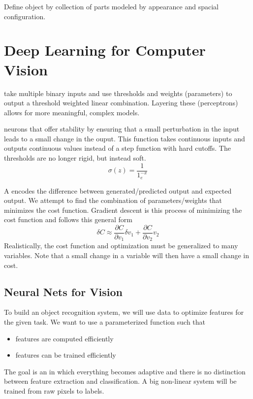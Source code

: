 \documentclass{article}
\begin{document}
\begin{definition}
  Define object by collection of parts modeled by appearance and spacial configuration. 
\end{definition}

\section{Deep Learning for Computer Vision}

 take multiple binary inputs and use thresholds and weights (parameters) to output a threshold weighted linear combination. Layering these  (perceptrons) allows for more meaningful, complex models.  

\begin{definition}
  neurons that offer stability by ensuring that a small perturbation in the input leads to a small change in the ouput. This function takes continuous inputs and outputs continuous values instead of a step function with hard cutoffs. The thresholds are no longer rigid, but instead soft. $$\sigma(z) = \frac{1}{1_e^{-x}}$$
\end{definition}

A  encodes the difference between generated/predicted output and expected output. We attempt to find the combination of parameters/weights that minimizes the cost function. Gradient descent is this process of minimizing the cost function and follows this general form $$\delta C \approx \frac{\partial C}{\partial v_1} \delta v_1 + \frac{\partial C}{\partial v_2} v_2$$ Realistically, the cost function and optimization must be generalized to many variables. Note that a small change in a variable will then have a small change in cost. 

\subsection{Neural Nets for Vision}

To build an object recognition system, we will use data to optimize features for the given task. We want to use a parameterized function such that 
\begin{itemize}
  \item features are computed efficiently 
  \item features can be trained efficiently
\end{itemize}
The goal is an  in which everything becomes adaptive and there is no distinction between feature extraction and classification. A big non-linear system will be trained from raw pixels to labels.\\ 
\end{document}
